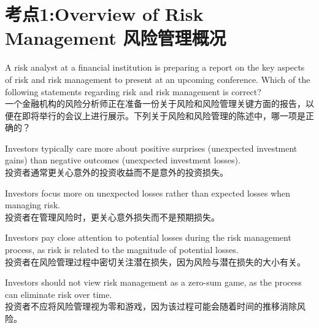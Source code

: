 \documentclass{article}
\newcounter{question} %
\begin{document}
 \tableofcontents %
\newpage



\iftrue
\section{考点1:Overview of Risk Management 风险管理概况}
\setcounter{question}{0}


\begin{question}
    A risk analyst at a financial institution is preparing a report on the key aspects of risk and risk management to present at an upcoming conference. Which of the following statements regarding risk and risk management is correct? \\
    一个金融机构的风险分析师正在准备一份关于风险和风险管理关键方面的报告，以便在即将举行的会议上进行展示。下列关于风险和风险管理的陈述中，哪一项是正确的？
    
\end{question}

\begin{choices}

        \item Investors typically care more about positive surprises (unexpected investment gains) than negative outcomes (unexpected investment losses). \\
        投资者通常更关心意外的投资收益而不是意外的投资损失。
        
        \item Investors focus more on unexpected losses rather than expected losses when managing risk. \\
        投资者在管理风险时，更关心意外损失而不是预期损失。
        
        \item Investors pay close attention to potential losses during the risk management process, as risk is related to the magnitude of potential losses. \\
        投资者在风险管理过程中密切关注潜在损失，因为风险与潜在损失的大小有关。
        
        \item Investors should not view risk management as a zero-sum game, as the process can eliminate risk over time. \\
        投资者不应将风险管理视为零和游戏，因为该过程可能会随着时间的推移消除风险。

\end{choices}
\end{document}
